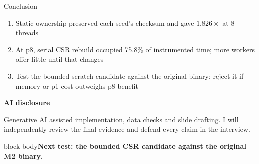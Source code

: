 \documentclass[aspectratio=169,10pt]{beamer}
\newcommand{\claim}[1]{\begin{beamercolorbox}[rounded=true,sep=.65em,wd=\linewidth]{block body}\centering\bfseries\color{moss}#1\end{beamercolorbox}}
\begin{document}
\begin{frame}{Conclusion}
\begin{enumerate}\itemsep.42em
  \item Static ownership preserved each seed's checksum and gave $1.826\times$ at 8 threads
  \item At p8, serial CSR rebuild occupied 75.8\% of instrumented time; more workers offer little until that changes
  \item Test the bounded scratch candidate against the original binary; reject it if memory or p1 cost outweighs p8 benefit
\end{enumerate}
\vspace{.7em}
\textbf{AI disclosure}\par
\small Generative AI assisted implementation, data checks and slide drafting. I will independently review the final evidence and defend every claim in the interview.
\vspace{.55em}
\claim{Next test: the bounded CSR candidate against the original M2 binary.}
\end{frame}
\end{document}
